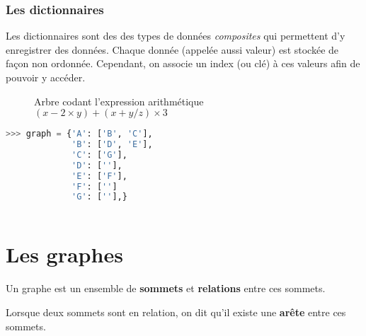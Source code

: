 \subsubsection{Les dictionnaires}

\begin{defi}[Dictionnaires]
Les dictionnaires sont des des types de données \textit{composites} qui permettent d'y enregistrer des données. Chaque donnée (appelée aussi valeur) est stockée de façon non ordonnée. Cependant, on associe un index (ou clé) à ces valeurs afin de pouvoir y accéder.
\end{defi}

\begin{figure}[H]
\centering
\captionsetup{justification=centering}
\caption{Arbre codant l'expression arithmétique $(x-2\times y)+\left(x+y/z\right)\times 3$}
\end{figure}


\begin{lstlisting}[language=python]
>>> graph = {'A': ['B', 'C'],
             'B': ['D', 'E'],
             'C': ['G'],
             'D': [''],
             'E': ['F'],
             'F': ['']
             'G': [''],}
    
\end{lstlisting}

\section{Les graphes}

\begin{defi}[Graphe]\cite{ref_01}
Un graphe est un ensemble de \textbf{sommets} et  \textbf{relations} entre ces sommets.

Lorsque deux sommets sont en relation, on dit qu'il existe une \textbf{arête} entre ces sommets.
\end{defi}


